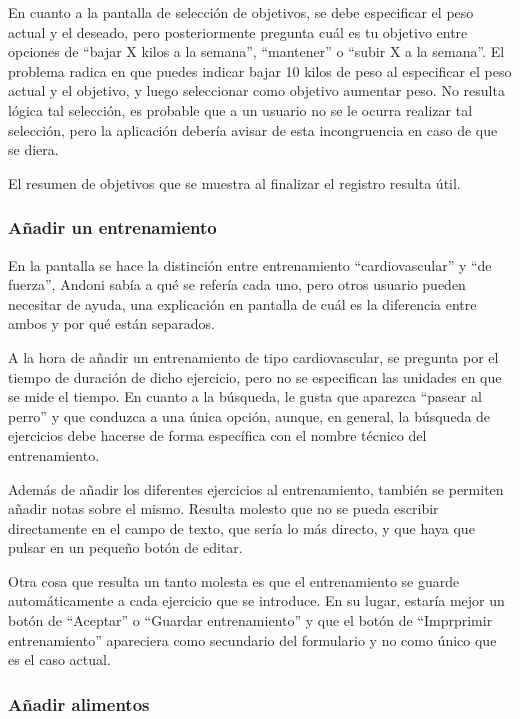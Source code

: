 \documentclass[a4paper]{article}
\begin{document}
			En cuanto a la pantalla de selección de objetivos, se debe especificar el peso actual y el deseado, pero posteriormente pregunta cuál es tu objetivo entre opciones de ``bajar X kilos a la semana'', ``mantener'' o ``subir X a la semana''. El problema radica en que puedes indicar bajar 10 kilos de peso al especificar el peso actual y el objetivo, y luego seleccionar como objetivo aumentar peso. No resulta lógica tal selección, es probable que a un usuario no se le ocurra realizar tal selección, pero la aplicación debería avisar de esta incongruencia en caso de que se diera.
			
			El resumen de objetivos que se muestra al finalizar el registro resulta útil.
			
			\subsubsection*{Añadir un entrenamiento}
			
			En la pantalla se hace la distinción entre entrenamiento ``cardiovascular'' y ``de fuerza'', Andoni sabía a qué se refería cada uno, pero otros usuario pueden necesitar de ayuda, una explicación en pantalla de cuál es la diferencia entre ambos y por qué están separados.
			
			A la hora de añadir un entrenamiento de tipo cardiovascular, se pregunta por el tiempo de duración de dicho ejercicio, pero no se especifican las unidades en que se mide el tiempo. En cuanto a la búsqueda, le gusta que aparezca ``pasear al perro'' y que conduzca a una única opción, aunque, en general, la búsqueda de ejercicios debe hacerse de forma específica con el nombre técnico del entrenamiento.
			
			Además de añadir los diferentes ejercicios al entrenamiento, también se permiten añadir notas sobre el mismo. Resulta molesto que no se pueda escribir directamente en el campo de texto, que sería lo más directo, y que haya que pulsar en un pequeño botón de editar.
			
			Otra cosa que resulta un tanto molesta es que el entrenamiento se guarde automáticamente a cada ejercicio que se introduce. En su lugar, estaría mejor un botón de ``Aceptar'' o ``Guardar entrenamiento'' y que el botón de ``Imprprimir entrenamiento'' apareciera como secundario del formulario y no como único que es el caso actual.
			
			\subsubsection*{Añadir alimentos}
			
\end{document}
